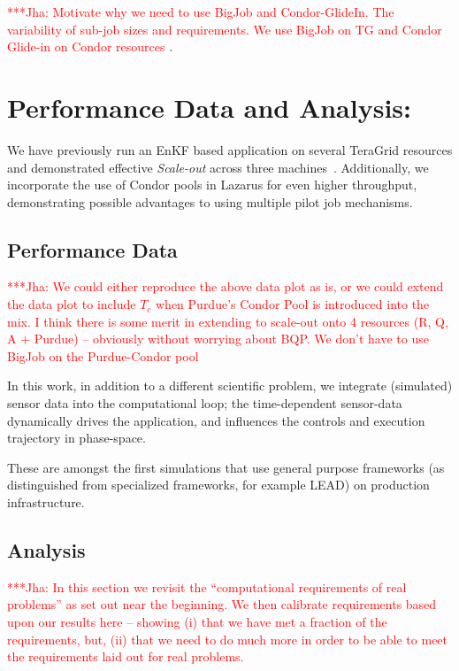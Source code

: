 \documentclass{rspublic}
\newcommand{\jhanote}[1]{ {\textcolor{red} { ***Jha: #1 }}}
\newcommand{\yyenote}[1]{ {\textcolor{blue} { ***yye00: #1 }}}
\newcommand{\jhanote}[1]{}
\newcommand{\yyenote}[1]{}
\begin{document}

\jhanote{Motivate why we need to use BigJob and Condor-GlideIn. The
  variability of sub-job sizes and requirements. We use BigJob on TG
  and Condor Glide-in on Condor resources}.

\section{Performance Data and Analysis:} 

We have previously run an EnKF based application on several TeraGrid
resources and demonstrated effective {\it Scale-out} across three
machines~\citep{gmac}.  Additionally, we incorporate the use of Condor
pools in Lazarus for even higher throughput, demonstrating possible
advantages to using multiple pilot job mechanisms.

\subsection{Performance Data} \jhanote{We could either reproduce the
  above data plot as is, or we could extend the data plot to include
  $T_c$ when Purdue's Condor Pool is introduced into the mix. I think
  there is some merit in extending to scale-out onto 4 resources (R,
  Q, A + Purdue) -- obviously without worrying about BQP. We don't
  have to use BigJob on the Purdue-Condor pool}

In this work, in addition to a different scientific problem, we
integrate (simulated) sensor data into the computational loop; the
time-dependent sensor-data dynamically drives the application, and
influences the controls and execution trajectory in phase-space.

These are amongst the first simulations
that use general purpose frameworks (as distinguished from specialized
frameworks, for example LEAD) on production infrastructure.

\subsection{Analysis} 

\jhanote{In this section we revisit the ``computational requirements
  of real problems'' as set out near the beginning. We then calibrate
  requirements based upon our results here -- showing (i) that we have
  met a fraction of the requirements, but, (ii) that we need to do
  much more in order to be able to meet the requirements laid out for
  real problems.}
  
\end{document}
